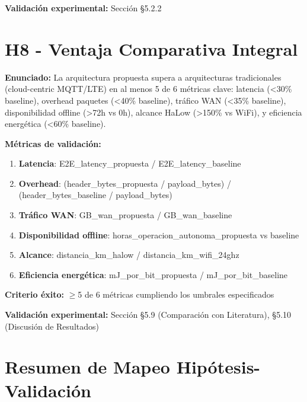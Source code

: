 \textbf{Validación experimental:} Sección §5.2.2

\section{H8 - Ventaja Comparativa Integral}

\textbf{Enunciado:} La arquitectura propuesta supera a arquitecturas tradicionales (cloud-centric MQTT/LTE) en al menos 5 de 6 métricas clave: latencia (<30\% baseline), overhead paquetes (<40\% baseline), tráfico WAN (<35\% baseline), disponibilidad offline (>72h vs 0h), alcance HaLow (>150\% vs WiFi), y eficiencia energética (<60\% baseline).

\textbf{Métricas de validación:}
\begin{enumerate}
\item \textbf{Latencia}: E2E\_latency\_propuesta / E2E\_latency\_baseline
\item \textbf{Overhead}: (header\_bytes\_propuesta / payload\_bytes) / (header\_bytes\_baseline / payload\_bytes)
\item \textbf{Tráfico WAN}: GB\_wan\_propuesta / GB\_wan\_baseline
\item \textbf{Disponibilidad offline}: horas\_operacion\_autonoma\_propuesta vs baseline
\item \textbf{Alcance}: distancia\_km\_halow / distancia\_km\_wifi\_24ghz
\item \textbf{Eficiencia energética}: mJ\_por\_bit\_propuesta / mJ\_por\_bit\_baseline
\end{enumerate}

\textbf{Criterio éxito:} $\geq$5 de 6 métricas cumpliendo los umbrales especificados

\textbf{Validación experimental:} Sección §5.9 (Comparación con Literatura), §5.10 (Discusión de Resultados)

\section{Resumen de Mapeo Hipótesis-Validación}

